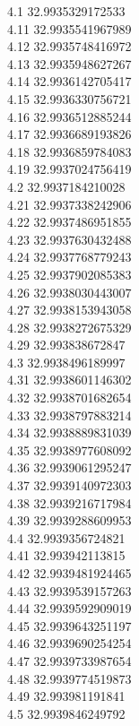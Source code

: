 {4.1	32.9935329172533\\
4.11	32.9935541967989\\
4.12	32.9935748416972\\
4.13	32.9935948627267\\
4.14	32.9936142705417\\
4.15	32.9936330756721\\
4.16	32.9936512885244\\
4.17	32.9936689193826\\
4.18	32.9936859784083\\
4.19	32.9937024756419\\
4.2	32.9937184210028\\
4.21	32.9937338242906\\
4.22	32.9937486951855\\
4.23	32.9937630432488\\
4.24	32.9937768779243\\
4.25	32.9937902085383\\
4.26	32.9938030443007\\
4.27	32.9938153943058\\
4.28	32.9938272675329\\
4.29	32.993838672847\\
4.3	32.9938496189997\\
4.31	32.9938601146302\\
4.32	32.9938701682654\\
4.33	32.9938797883214\\
4.34	32.9938889831039\\
4.35	32.9938977608092\\
4.36	32.9939061295247\\
4.37	32.9939140972303\\
4.38	32.9939216717984\\
4.39	32.9939288609953\\
4.4	32.9939356724821\\
4.41	32.993942113815\\
4.42	32.9939481924465\\
4.43	32.9939539157263\\
4.44	32.9939592909019\\
4.45	32.9939643251197\\
4.46	32.9939690254254\\
4.47	32.9939733987654\\
4.48	32.9939774519873\\
4.49	32.993981191841\\
4.5	32.9939846249792\\
}
